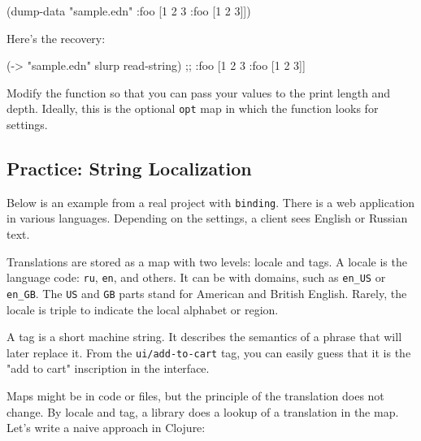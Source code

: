 \else

\begin{english}
  \begin{clojure}
(dump-data "sample.edn" {:foo [1 2 3 {:foo [1 2 3]}]})
  \end{clojure}
\end{english}

\fi

\noindent
Here's the recovery:

\begin{english}
  \begin{clojure}
(-> "sample.edn" slurp read-string)
;; {:foo [1 2 3 {:foo [1 2 3]}]}
  \end{clojure}
\end{english}


Modify the function so that you can pass your values to the print length and depth.
Ideally, this is the optional \verb|opt| map in which the function looks for settings.

\subsection{Practice: String Localization}

\label{translate}

Below is an example from a real project with \verb|binding|. There is a web application in various languages. Depending on the settings, a client sees English or Russian text.


Translations are stored as a map with two levels: locale and tags. A locale is the language code: \verb|ru|, \verb|en|, and others. It can be with domains, such as \verb|en_US| or \verb|en_GB|.
The \verb|US| and \verb|GB| parts stand for American and British English.
Rarely, the locale is triple to indicate the local alphabet or region.

A tag is a short machine string.
It describes the semantics of a phrase that will later replace it.
From the \verb|ui/add-to-cart| tag, you can easily guess that it is the "add to cart" inscription in the interface.

Maps might be in code or files, but the principle of the translation does not change. By locale and tag, a library does a lookup of a translation in the map.
Let's write a naive approach in Clojure:

